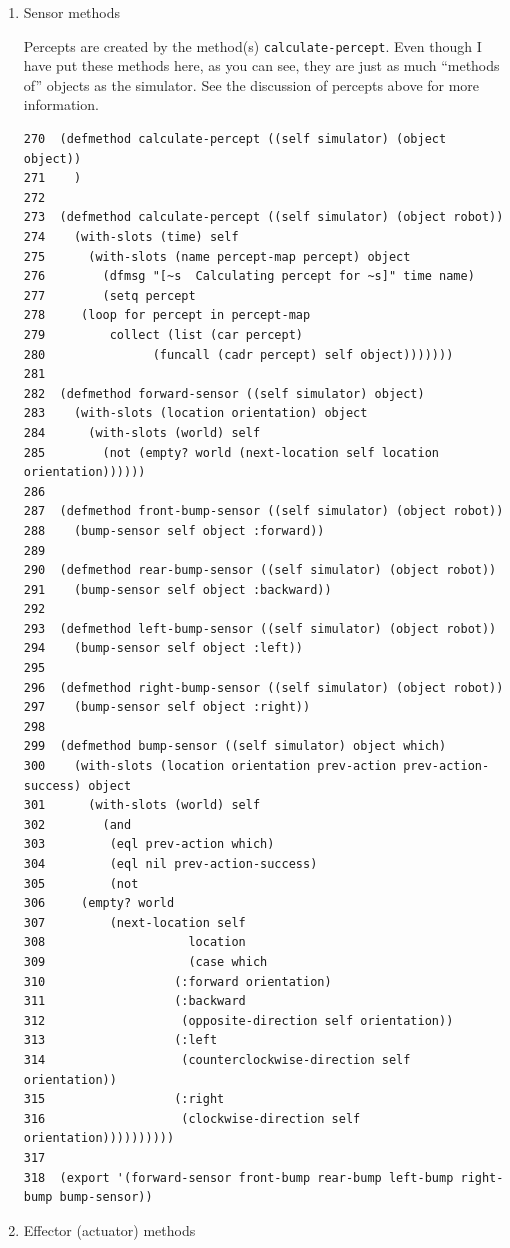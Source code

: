 \documentclass[11pt]{tufte-handout}
\begin{document}
\begin{enumerate}
\item Sensor methods
\label{sec:org75c16c5}

Percepts are created by the method(s) \texttt{calculate-percept}.  Even though I have put these methods here, as you can see, they are just as much ``methods of'' objects as the simulator.   See the discussion of percepts above for more information.

\begin{verbatim}
270  (defmethod calculate-percept ((self simulator) (object object))
271    )
272  
273  (defmethod calculate-percept ((self simulator) (object robot))
274    (with-slots (time) self
275      (with-slots (name percept-map percept) object
276        (dfmsg "[~s  Calculating percept for ~s]" time name)
277        (setq percept 
278  	(loop for percept in percept-map
279  	    collect (list (car percept)
280  			  (funcall (cadr percept) self object)))))))
281  
282  (defmethod forward-sensor ((self simulator) object)
283    (with-slots (location orientation) object
284      (with-slots (world) self
285        (not (empty? world (next-location self location orientation))))))
286  
287  (defmethod front-bump-sensor ((self simulator) (object robot))
288    (bump-sensor self object :forward))
289  
290  (defmethod rear-bump-sensor ((self simulator) (object robot))
291    (bump-sensor self object :backward))
292  
293  (defmethod left-bump-sensor ((self simulator) (object robot))
294    (bump-sensor self object :left))
295  
296  (defmethod right-bump-sensor ((self simulator) (object robot))
297    (bump-sensor self object :right))
298  
299  (defmethod bump-sensor ((self simulator) object which)
300    (with-slots (location orientation prev-action prev-action-success) object
301      (with-slots (world) self
302        (and
303         (eql prev-action which)
304         (eql nil prev-action-success)
305         (not
306  	(empty? world
307  		(next-location self
308  			       location 
309  			       (case which
310  				 (:forward orientation)
311  				 (:backward
312  				  (opposite-direction self orientation))
313  				 (:left
314  				  (counterclockwise-direction self orientation))
315  				 (:right
316  				  (clockwise-direction self orientation))))))))))
317  
318  (export '(forward-sensor front-bump rear-bump left-bump right-bump bump-sensor))
\end{verbatim}
\item Effector (actuator) methods
\label{sec:orga253c21}


\end{enumerate}
\end{document}
